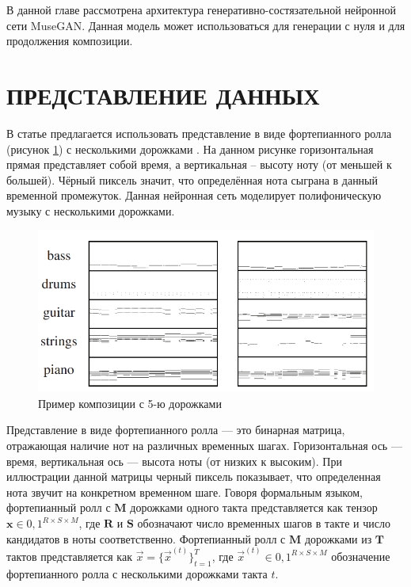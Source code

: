 В данной главе рассмотрена архитектура генеративно-состязательной нейронной сети MuseGAN. Данная модель может использоваться для генерации с нуля и для продолжения композиции.

\section{ПРЕДСТАВЛЕНИЕ ДАННЫХ}

    В статье предлагается использовать представление в виде фортепианного ролла (рисунок \ref{fig:midi}) с несколькими дорожками \cite{musegan}. На данном рисунке горизонтальная прямая представляет собой время, а вертикальная -- высоту ноту (от меньшей к большей). Чёрный пиксель значит, что определённая нота сыграна в данный временной промежуток. Данная нейронная сеть моделирует полифоническую музыку с несколькими дорожками.
    
    \begin{figure}
        \centering
        \includegraphics[scale=0.7]{tex/png/midi-example.png}
        \caption{Пример композиции с 5-ю дорожками \cite{musegan}}
        \label{fig:midi}
    \end{figure}
    
    
    Представление в виде фортепианного ролла — это бинарная матрица, отражающая наличие нот на различных временных шагах. 
    Горизонтальная ось — время, вертикальная ось — высота ноты (от низких к высоким). 
    При иллюстрации данной матрицы черный пиксель показывает, что определенная нота звучит на конкретном временном шаге. 
    Говоря формальным языком, фортепианный ролл с $\mathbf{M}$ дорожками одного такта представляется как тензор $ \mathbf{x} \in {0,1}^{R \times S \times M}$, где $ \mathbf{R} $ и $ \mathbf{S} $ обозначают число временных шагов в такте и число кандидатов в ноты соответственно. 
    Фортепианный ролл с $ \mathbf{M} $ дорожками из $ \mathbf{T} $ тактов представляется как $ \vec{x} = \{\vec{x}^{(t)}\}^T _ {t=1} $, где $ \vec{x}^{(t)} \in {0,1}^{R \times S \times M} $ обозначение фортепианного ролла с несколькими дорожками такта $ t $.
    
